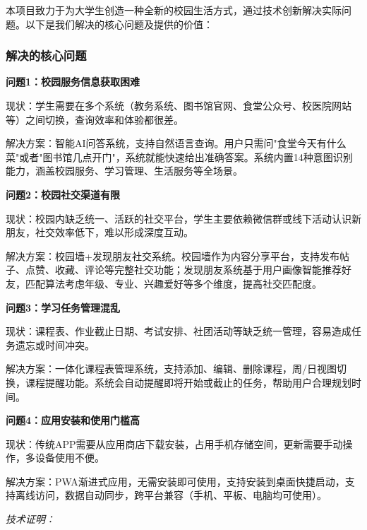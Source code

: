 \documentclass[12pt,a4paper]{article}
\begin{document}
本项目致力于为大学生创造一种全新的校园生活方式，通过技术创新解决实际问题。以下是我们解决的核心问题及提供的价值：

\subsubsection{解决的核心问题}

\textbf{问题1：校园服务信息获取困难}

现状：学生需要在多个系统（教务系统、图书馆官网、食堂公众号、校医院网站等）之间切换，查询效率和体验都很差。

解决方案：智能AI问答系统，支持自然语言查询。用户只需问"食堂今天有什么菜"或者"图书馆几点开门"，系统就能快速给出准确答案。系统内置14种意图识别能力，涵盖校园服务、学习管理、生活服务等全场景。

\textbf{问题2：校园社交渠道有限}

现状：校园内缺乏统一、活跃的社交平台，学生主要依赖微信群或线下活动认识新朋友，社交效率低下，难以形成深度互动。

解决方案：校园墙+发现朋友社交系统。校园墙作为内容分享平台，支持发布帖子、点赞、收藏、评论等完整社交功能；发现朋友系统基于用户画像智能推荐好友，匹配算法考虑年级、专业、兴趣爱好等多个维度，提高社交匹配度。

\textbf{问题3：学习任务管理混乱}

现状：课程表、作业截止日期、考试安排、社团活动等缺乏统一管理，容易造成任务遗忘或时间冲突。

解决方案：一体化课程表管理系统，支持添加、编辑、删除课程，周/日视图切换，课程提醒功能。系统会自动提醒即将开始或截止的任务，帮助用户合理规划时间。

\textbf{问题4：应用安装和使用门槛高}

现状：传统APP需要从应用商店下载安装，占用手机存储空间，更新需要手动操作，多设备使用不便。

解决方案：PWA渐进式应用，无需安装即可使用，支持安装到桌面快捷启动，支持离线访问，数据自动同步，跨平台兼容（手机、平板、电脑均可使用）。

\textit{技术证明：}
\end{document}
